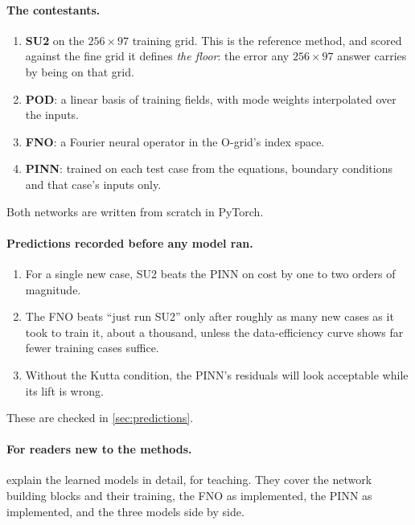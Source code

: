 \documentclass[11pt]{article}
\begin{document}
\paragraph{The contestants.}
\begin{enumerate}
  \item \textbf{SU2} on the $256\times97$ training grid. This is the reference method, and scored
    against the fine grid it defines \emph{the floor}: the error any $256\times97$ answer carries
    by being on that grid.
  \item \textbf{POD}: a linear basis of training fields, with mode weights interpolated over the
    inputs.
  \item \textbf{FNO}: a Fourier neural operator in the O-grid's index space.
  \item \textbf{PINN}: trained on each test case from the equations, boundary conditions and that
    case's inputs only.
\end{enumerate}
Both networks are written from scratch in PyTorch.

\paragraph{Predictions recorded before any model ran.}
\begin{enumerate}[label=P\arabic*.]
  \item For a single new case, SU2 beats the PINN on cost by one to two orders of magnitude.
  \item The FNO beats ``just run SU2'' only after roughly as many new cases as it took to train it,
    about a thousand, unless the data-efficiency curve shows far fewer training cases suffice.
  \item Without the Kutta condition, the PINN's residuals will look acceptable while its lift is
    wrong.
\end{enumerate}
These are checked in \cref{sec:predictions}.

\paragraph{For readers new to the methods.}
 explain the learned models in detail, for
teaching. They cover the network building blocks and their training, the FNO as implemented,
the PINN as implemented, and the three models side by side.
\end{document}
